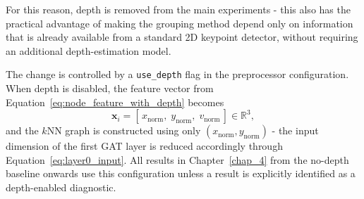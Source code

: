 For this reason, depth is removed from the main experiments -
this also has the practical advantage
of making the grouping method depend only on information
that is already available from a standard 2D keypoint detector,
without requiring an additional depth-estimation model.

The change is controlled by a \texttt{use\_depth} flag in the preprocessor configuration.
When depth is disabled,
the feature vector from Equation~\eqref{eq:node_feature_with_depth} becomes
\begin{equation}
    \mathbf{x}_i
    =
    [\,x_{\text{norm}},\;
      y_{\text{norm}},\;
      v_{\text{norm}}\,]
    \in \mathbb{R}^{3},
    \label{eq:node_feature_no_depth}
\end{equation}
and the $k$NN graph is constructed using only $(x_{\text{norm}},y_{\text{norm}})$ -
the input dimension of the first GAT layer is reduced accordingly
through Equation~\eqref{eq:layer0_input}.
All results in Chapter~\ref{chap_4} from the no-depth baseline onwards use this configuration
unless a result is explicitly identified as a depth-enabled diagnostic.